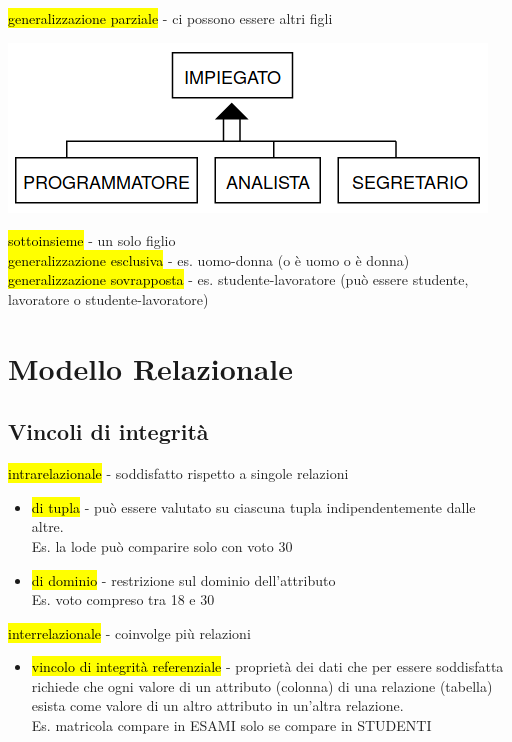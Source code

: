 \documentclass[a4paper]{article}
\begin{document}
\hl{generalizzazione parziale} - ci possono essere altri figli
\begin{center}
      \includegraphics[scale=0.5]{img/er6.png}
\end{center}
\hl{sottoinsieme} - un solo figlio\medskip\\
\hl{generalizzazione esclusiva} - es. uomo-donna (o è uomo o è donna)\medskip\\
\hl{generalizzazione sovrapposta} - es. studente-lavoratore (può essere studente, lavoratore o studente-lavoratore)

\section{Modello Relazionale}
\subsection{Vincoli di integrità}
\hl{intrarelazionale} - soddisfatto rispetto a singole relazioni
\begin{itemize}
  \item[] \hl{di tupla} -  può essere valutato su ciascuna tupla indipendentemente dalle altre.\\
  Es. la lode può comparire solo con voto 30
  \item[] \hl{di dominio} - restrizione sul dominio dell’attributo\\
  Es. voto compreso tra 18 e 30
\end{itemize}
\hl{interrelazionale} - coinvolge più relazioni
\begin{itemize}
  \item[] \hl{vincolo di integrità referenziale} - proprietà dei dati che per essere soddisfatta richiede che ogni valore di un attributo (colonna) di una relazione (tabella) esista come valore di un altro attributo in un'altra relazione.\\
  Es. matricola compare in ESAMI solo se compare in STUDENTI
\end{itemize}
\end{document}
